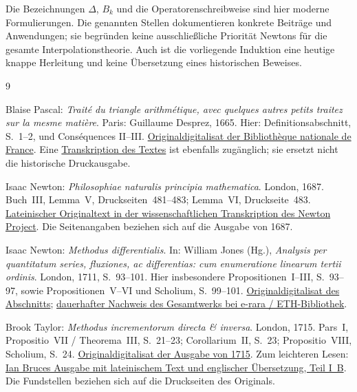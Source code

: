 Die Bezeichnungen $\Delta$, $B_k$ und die Operatorenschreibweise sind
hier moderne Formulierungen. Die genannten Stellen dokumentieren
konkrete Beiträge und Anwendungen; sie begründen keine ausschließliche
Priorität Newtons für die gesamte Interpolationstheorie. Auch ist die
vorliegende Induktion eine heutige knappe Herleitung und keine
Übersetzung eines historischen Beweises.

\begin{thebibliography}{9}
\small
\setlength{\itemsep}{.65em}

Blaise Pascal: \emph{Traité du triangle arithmétique, avec quelques
autres petits traitez sur la mesme matière}.
Paris: Guillaume Desprez, 1665.
Hier: Definitionsabschnitt, S.~1--2, und Conséquences II--III.
\href{https://gallica.bnf.fr/ark:/12148/btv1b86262012}{Originaldigitalisat der Bibliothèque nationale de France}.
Eine \href{https://fr.wikisource.org/wiki/Trait%C3%A9_du_triangle_arithm%C3%A9tique}{Transkription des Textes}
ist ebenfalls zugänglich; sie ersetzt nicht die historische Druckausgabe.

Isaac Newton: \emph{Philosophiae naturalis principia mathematica}.
London, 1687. Buch~III, Lemma~V, Druckseiten~481--483;
Lemma~VI, Druckseite~483.
\href{https://www.newtonproject.ox.ac.uk/view/texts/normalized/NATP00301}{Lateinischer Originaltext in der wissenschaftlichen Transkription des Newton Project}.
Die Seitenangaben beziehen sich auf die Ausgabe von 1687.

Isaac Newton: \emph{Methodus differentialis}.
In: William Jones (Hg.), \emph{Analysis per quantitatum series,
fluxiones, ac differentias: cum enumeratione linearum tertii ordinis}.
London, 1711, S.~93--101. Hier insbesondere Propositionen~I--III,
S.~93--97, sowie Propositionen~V--VI und Scholium, S.~99--101.
\href{https://www.e-rara.ch/download/pdf/2621379.pdf}{Originaldigitalisat des Abschnitts};
\href{https://doi.org/10.3931/e-rara-8934}{dauerhafter Nachweis des Gesamtwerks bei e-rara / ETH-Bibliothek}.

Brook Taylor: \emph{Methodus incrementorum directa \& inversa}.
London, 1715. Pars~I, Propositio~VII / Theorema~III, S.~21--23;
Corollarium~II, S.~23; Propositio~VIII, Scholium, S.~24.
\href{https://archive.org/details/UFIE003454_TO0324_PNI-2529_000000}{Originaldigitalisat der Ausgabe von 1715}.
Zum leichteren Lesen:
\href{https://www.17centurymaths.com/contents/brooktaylor/methodofincrementsparttwo.pdf}{Ian Bruces Ausgabe mit lateinischem Text und englischer Übersetzung, Teil I~B}.
Die Fundstellen beziehen sich auf die Druckseiten des Originals.

\end{thebibliography}
